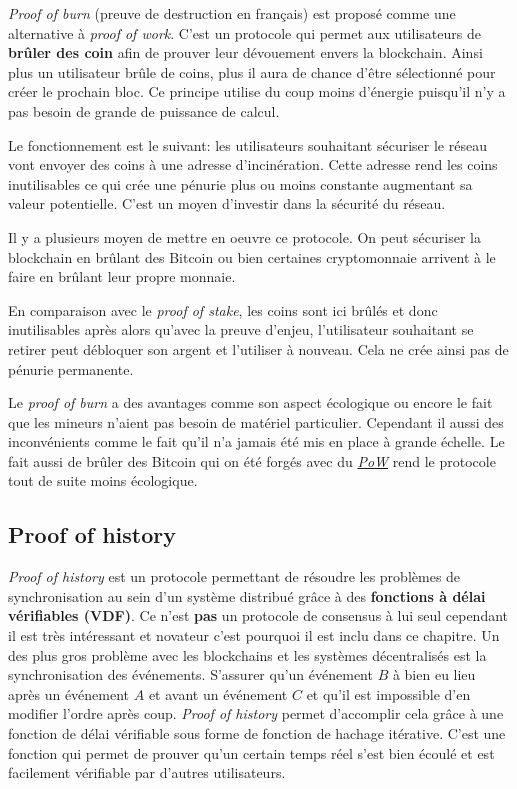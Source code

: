 \documentclass[../tb_report.tex]{subfiles}
\begin{document}
\textit{Proof of burn} (preuve de destruction en français) est proposé comme une alternative à \textit{proof of work}. C'est un protocole qui permet aux utilisateurs de \textbf{brûler des coin} afin de prouver leur dévouement envers la blockchain. Ainsi plus un utilisateur brûle de coins, plus il aura de chance d'être sélectionné pour créer le prochain bloc. Ce principe utilise du coup moins d'énergie puisqu'il n'y a pas besoin de grande de puissance de calcul.

Le fonctionnement est le suivant: les utilisateurs souhaitant sécuriser le réseau vont envoyer des coins à une adresse d'incinération. Cette adresse rend les coins inutilisables ce qui crée une pénurie plus ou moins constante augmentant sa valeur potentielle. C'est un moyen d'investir dans la sécurité du réseau.

Il y a plusieurs moyen de mettre en oeuvre ce protocole. On peut sécuriser la blockchain en brûlant des Bitcoin ou bien certaines cryptomonnaie arrivent à le faire en brûlant leur propre monnaie.

En comparaison avec le \textit{proof of stake}, les coins sont ici brûlés et donc inutilisables après alors qu'avec la preuve d'enjeu, l'utilisateur souhaitant se retirer peut débloquer son argent et l'utiliser à nouveau. Cela ne crée ainsi pas de pénurie permanente.

Le \textit{proof of burn} a des avantages comme son aspect écologique ou encore le fait que les mineurs n'aient pas besoin de matériel particulier. Cependant il aussi des inconvénients comme le fait qu'il n'a jamais été mis en place à grande échelle. Le fait aussi de brûler des Bitcoin qui on été forgés avec du \hyperref[consensus:pow]{\textit{PoW}} rend le protocole tout de suite moins écologique.

\subsection{Proof of history}

\textit{Proof of history} \cite{proof:poh} est un protocole permettant de résoudre les problèmes de synchronisation au sein d'un système distribué grâce à des \textbf{fonctions à délai vérifiables (VDF)}. Ce n'est \textbf{pas} un protocole de consensus à lui seul cependant il est très intéressant et novateur c'est pourquoi il est inclu dans ce chapitre. Un des plus gros problème avec les blockchains et les systèmes décentralisés est la synchronisation des événements. S'assurer qu'un événement $B$ à bien eu lieu après un événement $A$ et avant un événement $C$ et qu'il est impossible d'en modifier l'ordre après coup. \textit{Proof of history} permet d'accomplir cela grâce à une fonction de délai vérifiable sous forme de fonction de hachage itérative. C'est une fonction qui permet de prouver qu'un certain temps réel s'est bien écoulé et est facilement vérifiable par d'autres utilisateurs.
\end{document}
